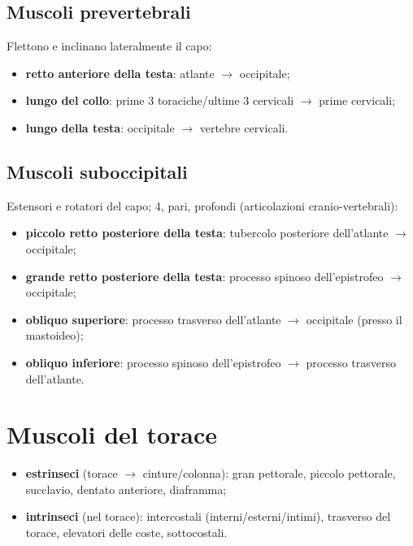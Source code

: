 \subsection{Muscoli prevertebrali}
Flettono e inclinano lateralmente il capo:
\begin{itemize}
  \item \textbf{retto anteriore della testa}: atlante $\rightarrow$ occipitale;
  \item \textbf{lungo del collo}: prime 3 toraciche/ultime 3 cervicali $\rightarrow$ prime cervicali;
  \item \textbf{lungo della testa}: occipitale $\rightarrow$ vertebre cervicali.
\end{itemize}

\subsection{Muscoli suboccipitali}
Estensori e rotatori del capo; 4, pari, profondi (articolazioni cranio-vertebrali):
\begin{itemize}
  \item \textbf{piccolo retto posteriore della testa}: tubercolo posteriore dell'atlante
    $\rightarrow$ occipitale;
  \item \textbf{grande retto posteriore della testa}: processo spinoso dell'epistrofeo $\rightarrow$
    occipitale;
  \item \textbf{obliquo superiore}: processo trasverso dell'atlante $\rightarrow$ occipitale (presso
    il mastoideo);
  \item \textbf{obliquo inferiore}: processo spinoso dell'epistrofeo $\rightarrow$ processo trasverso
    dell'atlante.
\end{itemize}

\section{Muscoli del torace}

\begin{itemize}
  \item \textbf{estrinseci} (torace $\rightarrow$ cinture/colonna): gran pettorale, piccolo
    pettorale, succlavio, dentato anteriore, diaframma;
  \item \textbf{intrinseci} (nel torace): intercostali (interni/esterni/intimi), trasverso del
    torace, elevatori delle coste, sottocostali.
\end{itemize}

